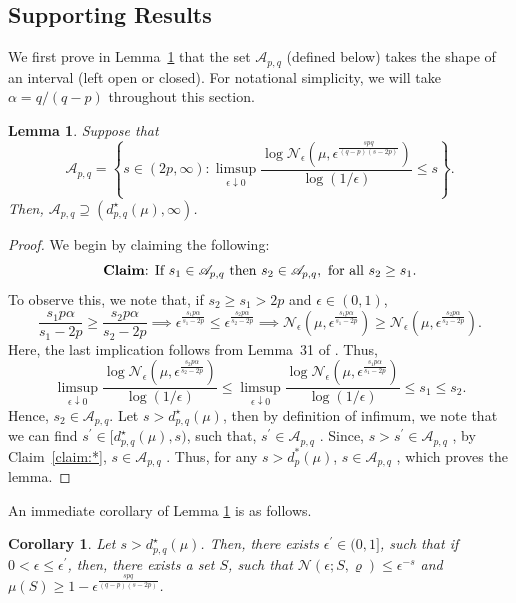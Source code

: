 \documentclass[12pts]{article}
\newtheorem{lemma}[defn]{Lemma}%
\newtheorem{cor}[defn]{Corollary}%
\newcommand{\cN}{ \mathcal{N}}
\newcommand{\sA}{ \mathscr{A}}
\newcommand{\sN}{ \mathscr{N}}
\begin{document}
\subsection{Supporting Results}
We first prove in Lemma~\ref{lem_c1} that the set $\sA_{p,q}$  (defined below) takes the shape of an interval (left open or closed). For notational simplicity, we will take $\alpha = q/(q-p)$ throughout this section.
\begin{lemma}\label{lem_c1}
   Suppose that \[\sA_{p,q} = \left\{s \in (2p, \infty) : \limsup_{\epsilon \downarrow 0} \frac{\log \sN_{\epsilon}\left(\mu, \epsilon^{\frac{s p q}{(q-p)(s-2p)}}\right)}{\log(1/\epsilon)} \leq s \right\}.\] Then, $\sA_{p,q} \supseteq (d^\star_{p,q}(\mu), \infty)$. 
\end{lemma}
\begin{proof}
     We begin by claiming the following: 
     \begin{equation}\label{claim:*}
        \text{\textbf{Claim}: If } s_1 \in \sA_{p,q} \text{ then } s_2 \in \sA_{p,q}, \text{ for all } s_2 \ge s_1 .
     \end{equation}
     To observe this, we note that,  if $s_2 \ge s_1>2 p$ and $\epsilon \in (0,1)$, 
 \[\frac{s_1 p \alpha}{s_1-2p } \ge  \frac{s_2 p \alpha}{s_2-2p} \implies \epsilon^{\frac{s_1 p \alpha}{s_1-2p}} \le  \epsilon^{\frac{s_2 p \alpha}{s_2-2p}} \implies \sN_{\epsilon}\left(\mu, \epsilon^{\frac{s_1 p \alpha}{s_1-2p}}\right) \ge \sN_{\epsilon}\left(\mu, \epsilon^{\frac{s_2 p \alpha}{s_2-2p}}\right).\]
Here, the last implication follows from Lemma~31 of \citet{JMLR:v26:24-0054}. Thus,
\[\limsup_{\epsilon \downarrow 0} \frac{\log \sN_{\epsilon}\left(\mu, \epsilon^{\frac{s_2 p \alpha}{s_2-2p}}\right)}{\log(1/\epsilon)} \le \limsup_{\epsilon \downarrow 0} \frac{\log \sN_{\epsilon}\left(\mu, \epsilon^{\frac{s_1 p \alpha}{s_1-2p}}\right)}{\log(1/\epsilon)} \le s_1 \le s_2.\]
Hence, $s_2 \in \sA_{p,q}$. Let $s > d^\star_{p,q}(\mu)$, then by definition of infimum, we note that
we can find $s^{\prime} \in [d^\star_{p,q}(\mu), s)$, such that, $s^{\prime} \in \sA_{p,q}$ . Since, $s>s^\prime \in \sA_{p,q}$ , by Claim~\eqref{claim:*}, $s \in \sA_{p,q}$ . Thus, for any $s > d^\ast_p(\mu)$, $s\in \sA_{p,q}$ , which proves the lemma.

\end{proof}

An immediate corollary of Lemma \ref{lem_c1} is as follows.
  \begin{cor}\label{cor_c1}
      Let $s > d^\star_{p, q}(\mu)$. Then, there exists $\epsilon^\prime \in (0,1]$, such that if $ 0< \epsilon \le \epsilon^\prime$, then, there exists a set $S$, such that $\cN(\epsilon; S, \varrho) \le \epsilon^{-s} $ and $\mu(S) \ge 1 - \epsilon^{\frac{s  p q}{(q-p)(s-2p)}}$.
  \end{cor}
 
\end{document}
